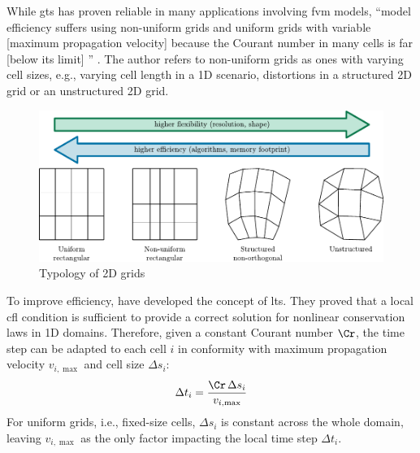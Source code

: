 While \gls{gts} has proven reliable in many applications involving \gls{fvm} models, ``model efficiency suffers using non-uniform grids and uniform grids with variable 
[maximum propagation velocity] 
because the Courant number in many cells is far 
[below its limit]%
'' \autocite{sanders2008}.
The author refers to non-uniform grids as ones with varying cell sizes, e.g., varying cell length in a \gls{1D} scenario, distortions in a structured \gls{2D} grid or an unstructured \gls{2D} grid. 

\begin{figure}[htbp]
	\centering
	\includegraphics[width=\textwidth]{./img/grid_types.pdf}
	\caption{Typology of \acrshort{2D} grids \autocite{lennart-hms}}
\end{figure}

To improve efficiency, \textcite{osher1983} have developed the concept of \gls{lts}. They proved that a local \gls{cfl} condition is sufficient to provide a correct solution for nonlinear conservation laws in \gls{1D} domains.
Therefore, given a constant Courant number $\Cr$,
the time step can be adapted to each cell $i$
in conformity with maximum propagation velocity $v_{i, \max}$ and cell size $\Delta s_i$:
\begin{equation}\label{eq:local-time-step}
	\Delta t_i = \frac{\Cr \, \Delta s_i}{v_{i, \max}}
\end{equation}
For uniform grids, i.e., fixed-size cells, $\Delta s_i$ is constant across the whole domain, leaving  $v_{i, \max}$ as the only factor impacting the local time step $\Delta t_i$.

